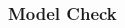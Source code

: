 \documentclass[aspectratio=169,10pt,t]{beamer}
\begin{document}
\begin{frame}[t]
    \frametitle{Model Check}
		\vspace{-0.7cm}
    \begin{columns}
        \begin{column}{0.5\textwidth}
            \begin{figure}[H]
							\scalebox{0.5}{
							
						}
            \end{figure} 
        \end{column}
        \begin{column}{0.5\textwidth}
            \begin{figure}[H]
							\scalebox{0.5}{
							
						}
            \end{figure}    
        \end{column}
    \end{columns}

\end{frame}
\end{document}
